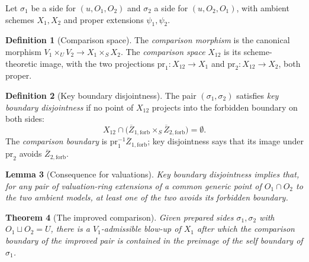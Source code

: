 \documentclass[11pt,a4paper]{article}
\theoremstyle{plain}
\newtheorem{theorem}{Theorem}[section]
\newtheorem{lemma}[theorem]{Lemma}
\theoremstyle{definition}
\newtheorem{definition}[theorem]{Definition}
\theoremstyle{remark}
\begin{document}
Let $\sigma_1$ be a side for $(u,O_1,O_2)$ and $\sigma_2$ a side for
$(u,O_2,O_1)$, with ambient schemes $X_1,X_2$ and proper extensions
$\psi_1,\psi_2$.

\begin{definition}[Comparison space]
\label{def:comparison-space}
The \emph{comparison morphism} is the canonical morphism
$V_1\times_U V_2\to X_1\times_S X_2$. The \emph{comparison space} $X_{12}$ is
its scheme-theoretic image, with the two projections
$\mathrm{pr}_1\colon X_{12}\to X_1$ and $\mathrm{pr}_2\colon X_{12}\to X_2$,
both proper.
\end{definition}

\begin{definition}[Key boundary disjointness]
\label{def:key-disjoint}
The pair $(\sigma_1,\sigma_2)$ satisfies \emph{key boundary disjointness} if no
point of $X_{12}$ projects into the forbidden boundary on both sides:
\[
  X_{12}\cap\bigl(\overline{Z}_{1,\mathrm{forb}}\times_S
  \overline{Z}_{2,\mathrm{forb}}\bigr)=\emptyset .
\]
The \emph{comparison boundary} is $\mathrm{pr}_1^{-1}\overline{Z}_{1,\mathrm{forb}}$;
key disjointness says that its image under $\mathrm{pr}_2$ avoids
$\overline{Z}_{2,\mathrm{forb}}$.
\end{definition}

\begin{lemma}[Consequence for valuations]
\label{lem:key-disjoint-avoids}
Key boundary disjointness implies that, for any pair of valuation-ring
extensions of a common generic point of $O_1\cap O_2$ to the two ambient
models, at least one of the two avoids its forbidden boundary.
\end{lemma}

\begin{theorem}[The improved comparison]
\label{thm:improved-comparison}
Given prepared sides $\sigma_1,\sigma_2$ with $O_1\sqcup O_2=U$, there is a
$V_1$-admissible blow-up of $X_1$ after which the comparison boundary of the
improved pair is contained in the preimage of the self boundary of $\sigma_1$.
\end{theorem}
\end{document}
